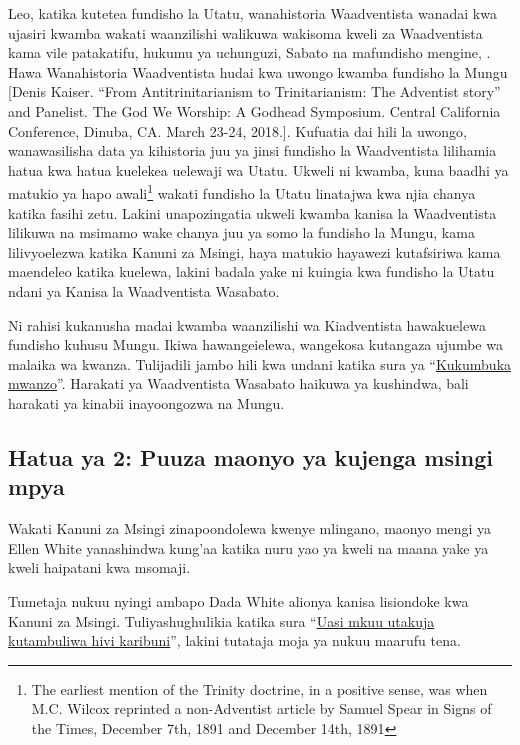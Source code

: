 Leo, katika kutetea fundisho la Utatu, wanahistoria Waadventista wanadai kwa ujasiri kwamba wakati waanzilishi walikuwa wakisoma kweli za Waadventista kama vile patakatifu, hukumu ya uchunguzi, Sabato na mafundisho mengine, . Hawa Wanahistoria Waadventista hudai kwa uwongo kwamba fundisho la Mungu [Denis Kaiser. “From Antitrinitarianism to Trinitarianism: The Adventist story” and Panelist. The God We Worship: A Godhead Symposium. Central California Conference, Dinuba, CA. March 23-24, 2018.]. Kufuatia dai hili la uwongo, wanawasilisha data ya kihistoria juu ya jinsi fundisho la Waadventista lilihamia hatua kwa hatua kuelekea uelewaji wa Utatu. Ukweli ni kwamba, kuna baadhi ya matukio ya hapo awali\footnote{The earliest mention of the Trinity doctrine, in a positive sense, was when M.C. Wilcox reprinted a non-Adventist article by Samuel Spear in Signs of the Times, December 7th, 1891 and December 14th, 1891} wakati fundisho la Utatu linatajwa kwa njia chanya katika fasihi zetu. Lakini unapozingatia ukweli kwamba kanisa la Waadventista lilikuwa na msimamo wake chanya juu ya somo la fundisho la Mungu, kama lilivyoelezwa katika Kanuni za Msingi, haya matukio hayawezi kutafsiriwa kama maendeleo katika kuelewa, lakini badala yake ni kuingia kwa fundisho la Utatu ndani ya Kanisa la Waadventista Wasabato.


Ni rahisi kukanusha madai kwamba waanzilishi wa Kiadventista hawakuelewa fundisho kuhusu Mungu. Ikiwa hawangeielewa, wangekosa kutangaza ujumbe wa malaika wa kwanza. Tulijadili jambo hili kwa undani katika sura ya “\hyperref[chap:remembering-the-beginning]{Kukumbuka mwanzo}”. Harakati ya Waadventista Wasabato haikuwa ya kushindwa, bali harakati ya kinabii inayoongozwa na Mungu.


\subsection*{Hatua ya 2: Puuza maonyo ya kujenga msingi mpya}


Wakati Kanuni za Msingi zinapoondolewa kwenye mlingano, maonyo mengi ya Ellen White yanashindwa kung'aa katika nuru yao ya kweli na maana yake ya kweli haipatani kwa msomaji.


Tumetaja nukuu nyingi ambapo Dada White alionya kanisa lisiondoke kwa Kanuni za Msingi. Tuliyashughulikia katika sura “\hyperref[chap:apostasy]{Uasi mkuu utakuja kutambuliwa hivi karibuni}”, lakini tutataja moja ya nukuu maarufu tena.


